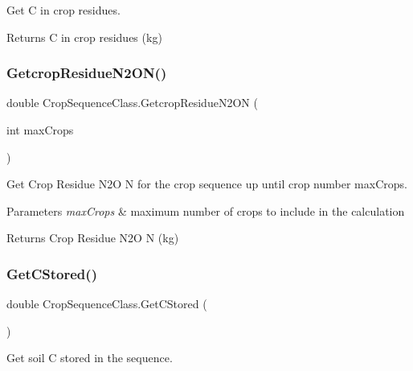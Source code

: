 Get C in crop residues. 

\begin{DoxyReturn}{Returns}
C in crop residues (kg) 
\end{DoxyReturn}
\mbox{\label{class_crop_sequence_class_a692e23e3e0d64b9b5932cea101d1534b}} 
\subsubsection{\texorpdfstring{GetcropResidueN2ON()}{GetcropResidueN2ON()}}
{\footnotesize\ttfamily double Crop\+Sequence\+Class.\+Getcrop\+Residue\+N2\+ON (\begin{DoxyParamCaption}\item[{int}]{max\+Crops }\end{DoxyParamCaption})\hspace{0.3cm}{\ttfamily [inline]}}



Get Crop Residue N2O N for the crop sequence up until crop number max\+Crops. 


\begin{DoxyParams}{Parameters}
{\em max\+Crops} & maximum number of crops to include in the calculation \\
\hline
\end{DoxyParams}
\begin{DoxyReturn}{Returns}
Crop Residue N2O N (kg) 
\end{DoxyReturn}
\mbox{\label{class_crop_sequence_class_a63cacd0e3943bbd08128560ccd116b5d}} 
\subsubsection{\texorpdfstring{GetCStored()}{GetCStored()}}
{\footnotesize\ttfamily double Crop\+Sequence\+Class.\+Get\+C\+Stored (\begin{DoxyParamCaption}{ }\end{DoxyParamCaption})\hspace{0.3cm}{\ttfamily [inline]}}



Get soil C stored in the sequence. 

